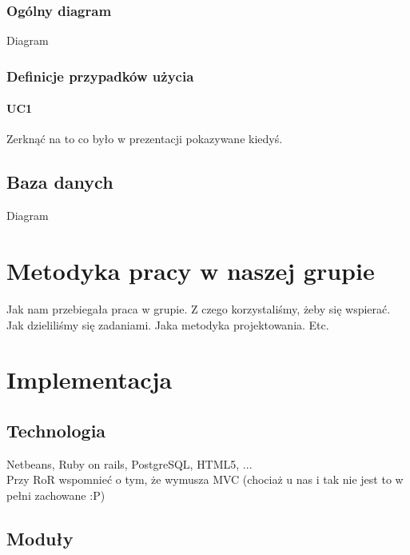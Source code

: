 \documentclass[pdflatex,11pt]{aghdpl}
\begin{document}
\subsection{Ogólny diagram}

Diagram

\subsection{Definicje przypadków użycia}

\subsubsection*{UC1}

Zerknąć na to co było w prezentacji pokazywane kiedyś.


\section{Baza danych}

Diagram



\chapter{Metodyka pracy w naszej grupie}

Jak nam przebiegała praca w grupie. Z czego korzystaliśmy, żeby się wspierać. Jak dzieliliśmy się zadaniami. Jaka metodyka projektowania. Etc.



\chapter{Implementacja}

\section{Technologia}

Netbeans, Ruby on rails, PostgreSQL, HTML5, ...\\
Przy RoR wspomnieć o tym, że wymusza MVC (chociaż u nas i tak nie jest to w pełni zachowane :P)

\section{Moduły}
\end{document}
